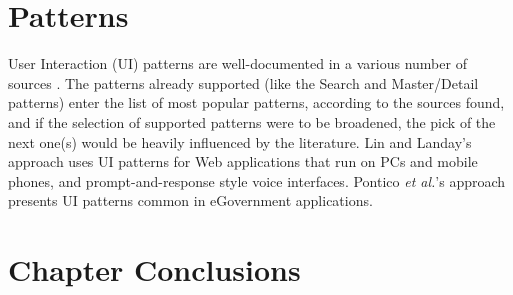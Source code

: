 \section{Patterns}\label{sec:patterns}
User Interaction (UI) patterns are well-documented in a various number of sources \cite{tidwell2010designing,van2001patterns, neil12standard,sinnig2005patterns}. The patterns already supported (like the Search and Master/Detail patterns) enter the list of most popular patterns, according to the sources found, and if the selection of supported patterns were to be broadened, the pick of the next one(s) would be heavily influenced by the literature. Lin and Landay's approach \cite{lin2008employing} uses UI patterns for Web applications that run on PCs and mobile phones, and prompt-and-response style voice interfaces. Pontico \textit{et al.}'s approach \cite{pontico2008organizing} presents UI patterns common in eGovernment applications.

\section{Chapter Conclusions}

